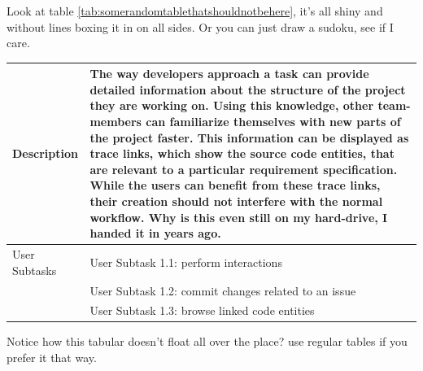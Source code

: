 Look at table \ref{tab:somerandomtablethatshouldnotbehere}, it's all shiny and without lines boxing it in on all sides. Or you can just draw a sudoku, see if I care.


\begin{center}
\begin{tabular}{ p{}  p{ }}
	\label{tab:somerandomtablethatshouldnotbehere}
	Description & The way developers approach a task can provide detailed information about the structure of the project they are working on.
	Using this knowledge, other team-members can familiarize themselves with new parts of the project faster.
	This information can be displayed as trace links, which show the source code entities, that are relevant to a particular requirement specification.
	While the users can benefit from these trace links, their creation should not interfere with the normal workflow. Why is this even still on my hard-drive, I handed it in years ago.\\
	\hline
	User Subtasks & User Subtask 1.1: perform interactions\\
	& User Subtask 1.2: commit changes related to an issue\\
	& User Subtask 1.3: browse linked code entities\\	
\end{tabular}
\end{center}

Notice how this tabular doesn't float all over the place? use regular tables if you prefer it that way.